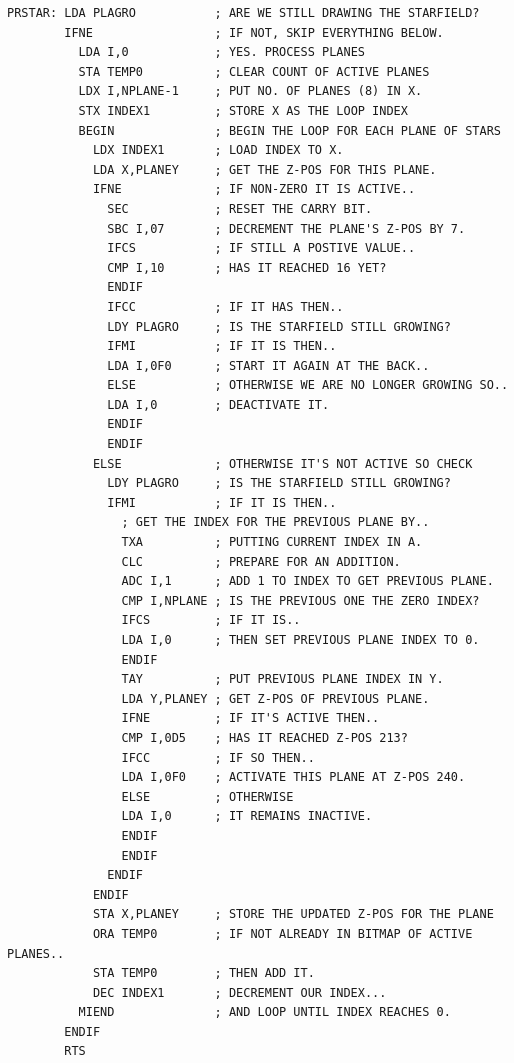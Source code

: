 \begin{lstlisting}
PRSTAR: LDA PLAGRO           ; ARE WE STILL DRAWING THE STARFIELD?
        IFNE                 ; IF NOT, SKIP EVERYTHING BELOW.
          LDA I,0            ; YES. PROCESS PLANES
          STA TEMP0          ; CLEAR COUNT OF ACTIVE PLANES
          LDX I,NPLANE-1     ; PUT NO. OF PLANES (8) IN X.
          STX INDEX1         ; STORE X AS THE LOOP INDEX
          BEGIN              ; BEGIN THE LOOP FOR EACH PLANE OF STARS
            LDX INDEX1       ; LOAD INDEX TO X.
            LDA X,PLANEY     ; GET THE Z-POS FOR THIS PLANE.
            IFNE             ; IF NON-ZERO IT IS ACTIVE..
              SEC            ; RESET THE CARRY BIT.
              SBC I,07       ; DECREMENT THE PLANE'S Z-POS BY 7.
              IFCS           ; IF STILL A POSTIVE VALUE..
              CMP I,10       ; HAS IT REACHED 16 YET?
              ENDIF
              IFCC           ; IF IT HAS THEN..
              LDY PLAGRO     ; IS THE STARFIELD STILL GROWING?
              IFMI           ; IF IT IS THEN..
              LDA I,0F0      ; START IT AGAIN AT THE BACK..
              ELSE           ; OTHERWISE WE ARE NO LONGER GROWING SO..
              LDA I,0        ; DEACTIVATE IT.
              ENDIF
              ENDIF
            ELSE             ; OTHERWISE IT'S NOT ACTIVE SO CHECK
              LDY PLAGRO     ; IS THE STARFIELD STILL GROWING?
              IFMI           ; IF IT IS THEN..
                ; GET THE INDEX FOR THE PREVIOUS PLANE BY..
                TXA          ; PUTTING CURRENT INDEX IN A. 
                CLC          ; PREPARE FOR AN ADDITION.
                ADC I,1      ; ADD 1 TO INDEX TO GET PREVIOUS PLANE.
                CMP I,NPLANE ; IS THE PREVIOUS ONE THE ZERO INDEX?
                IFCS         ; IF IT IS..
                LDA I,0      ; THEN SET PREVIOUS PLANE INDEX TO 0.
                ENDIF
                TAY          ; PUT PREVIOUS PLANE INDEX IN Y.
                LDA Y,PLANEY ; GET Z-POS OF PREVIOUS PLANE.
                IFNE         ; IF IT'S ACTIVE THEN..
                CMP I,0D5    ; HAS IT REACHED Z-POS 213?
                IFCC         ; IF SO THEN..
                LDA I,0F0    ; ACTIVATE THIS PLANE AT Z-POS 240.
                ELSE         ; OTHERWISE
                LDA I,0      ; IT REMAINS INACTIVE.
                ENDIF
                ENDIF
              ENDIF
            ENDIF
            STA X,PLANEY     ; STORE THE UPDATED Z-POS FOR THE PLANE
            ORA TEMP0        ; IF NOT ALREADY IN BITMAP OF ACTIVE PLANES..
            STA TEMP0        ; THEN ADD IT.
            DEC INDEX1       ; DECREMENT OUR INDEX...
          MIEND              ; AND LOOP UNTIL INDEX REACHES 0.
        ENDIF
        RTS
\end{lstlisting}

